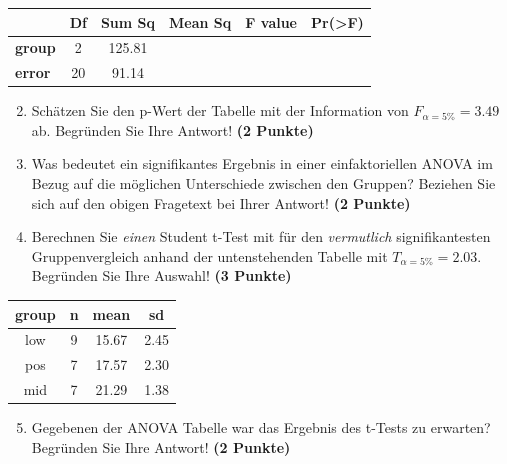 \documentclass[a4paper, 9pt]{scrartcl}\usepackage[]{graphicx}\usepackage[]{xcolor}
\newenvironment{knitrout}{}{} %
\begin{document}
\vspace{1Ex}

\begin{center}
  \Large
  \begin{tabular}{l|c|c|c|c|c}
     & \textbf{Df} & \textbf{Sum Sq} & \textbf{Mean Sq} & \textbf{F value} & \textbf{Pr(>F)} \strut\\
    \hline
   \textbf{group}  & 2 & 125.81 &  &  &  \strut\\
    \hline
   \textbf{error}  & 20 & 91.14 &  &  &  \strut\\
  \end{tabular}
\end{center}

\vspace{1Ex}

\begin{enumerate}
  \setcounter{enumi}{1}
\item Sch{\"a}tzen Sie den p-Wert der Tabelle mit der Information von
  $F_{\alpha = 5\%} = 3.49$ ab. Begr{\"u}nden Sie Ihre
  Antwort! \textbf{(2 Punkte)}
\item Was bedeutet ein signifikantes Ergebnis in einer einfaktoriellen
  ANOVA im Bezug auf die m{\"o}glichen Unterschiede zwischen den Gruppen?
  Beziehen Sie sich auf den obigen Fragetext bei Ihrer Antwort!  \textbf{(2
    Punkte)}
\item Berechnen Sie \textit{einen} Student t-Test mit f{\"u}r den \textit{vermutlich}
  signifikantesten Gruppenvergleich anhand der untenstehenden Tabelle mit
  $T_{\alpha = 5\%} = 2.03$. Begr{\"u}nden Sie Ihre Auswahl! \textbf{(3 Punkte)}
\end{enumerate}

\begin{knitrout}
\color{fgcolor}\begin{table}[!h]
\centering
\begin{tabular}{cccc}
\toprule
group & n & mean & sd\\
\midrule
low & 9 & 15.67 & 2.45\\
pos & 7 & 17.57 & 2.30\\
mid & 7 & 21.29 & 1.38\\
\bottomrule
\end{tabular}
\end{table}

\end{knitrout}

\begin{enumerate}
  \setcounter{enumi}{4}
\item Gegebenen der ANOVA Tabelle war das Ergebnis des t-Tests zu erwarten?
  Begr{\"u}nden Sie Ihre Antwort! \textbf{(2 Punkte)}
\end{enumerate}
\end{document}
